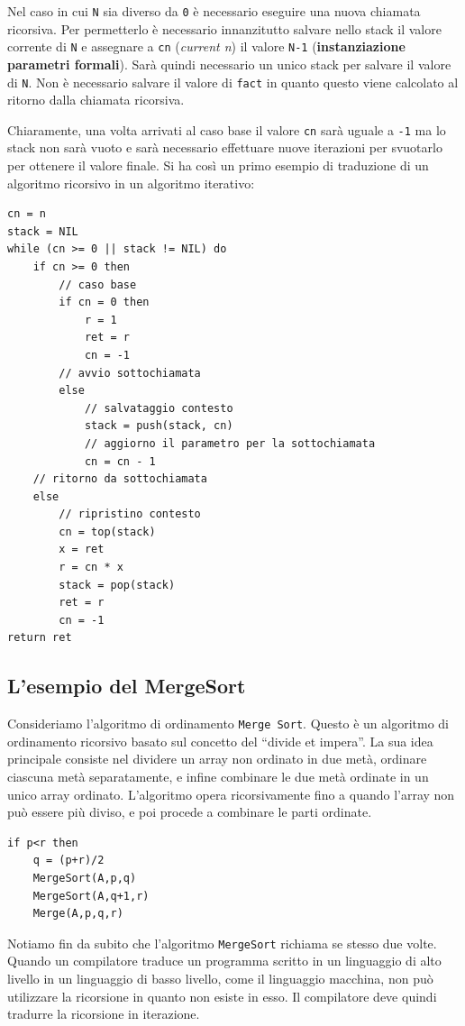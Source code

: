 Nel caso in cui \texttt{N} sia diverso da \texttt{0} è necessario eseguire una nuova chiamata ricorsiva. Per permetterlo è necessario innanzitutto salvare nello stack il valore corrente  di \texttt{N} e assegnare a \texttt{cn} (\textit{current n}) il valore \texttt{N-1} (\textbf{instanziazione parametri formali}). Sarà quindi necessario un unico stack per salvare il valore di \texttt{N}. Non è necessario salvare il valore di \texttt{fact} in quanto questo viene calcolato al ritorno dalla chiamata ricorsiva.

Chiaramente, una volta arrivati al caso base il valore \texttt{cn} sarà uguale a \texttt{-1} ma lo stack non sarà vuoto e sarà necessario effettuare nuove iterazioni per svuotarlo per ottenere il valore finale. Si ha così un primo esempio di traduzione di un algoritmo ricorsivo in un algoritmo iterativo:

\begin{lstlisting}[caption={Traduzione iterativa della funzione fattoriale},language=asd]
cn = n
stack = NIL
while (cn >= 0 || stack != NIL) do
	if cn >= 0 then
		// caso base
		if cn = 0 then
			r = 1
			ret = r
			cn = -1
		// avvio sottochiamata
		else
			// salvataggio contesto
			stack = push(stack, cn)
			// aggiorno il parametro per la sottochiamata
			cn = cn - 1
	// ritorno da sottochiamata
	else
		// ripristino contesto
		cn = top(stack)
		x = ret
		r = cn * x
		stack = pop(stack)
		ret = r
		cn = -1
return ret
\end{lstlisting}

\subsection{L'esempio del MergeSort}
Consideriamo l'algoritmo di ordinamento \texttt{Merge Sort}. Questo è un algoritmo di ordinamento ricorsivo basato sul concetto del ``divide et impera''. La sua idea principale consiste nel dividere un array non ordinato in due metà, ordinare ciascuna metà separatamente, e infine combinare le due metà ordinate in un unico array ordinato. L'algoritmo opera ricorsivamente fino a quando l'array non può essere più diviso, e poi procede a combinare le parti ordinate.

\begin{lstlisting}[caption={\textsc{MergeSort}(A,p,r)},language=asd,label={lst:mergeSortR}]
if p<r then
	q = (p+r)/2
	MergeSort(A,p,q)
	MergeSort(A,q+1,r)
	Merge(A,p,q,r)
\end{lstlisting}

Notiamo fin da subito che l'algoritmo \texttt{MergeSort} richiama se stesso due volte. Quando un compilatore traduce un programma scritto in un linguaggio di alto livello in un linguaggio di basso livello, come il linguaggio macchina, non può utilizzare la ricorsione in quanto non esiste in esso. Il compilatore deve quindi tradurre la ricorsione in iterazione.

